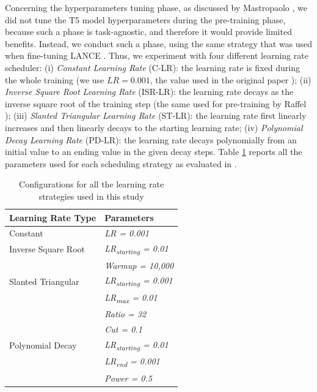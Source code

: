 Concerning the hyperparameters tuning phase, as discussed by Mastropaolo \etal \cite{mastropaolo2021studying}, we did not tune the T5 model hyperparameters during the pre-training phase, because such a phase is task-agnostic, and therefore it would provide limited benefits. Instead, we conduct such a phase, using the same strategy that was used when fine-tuning LANCE  \cite{mastropaolo2022using}. Thus, we experiment with four different learning rate scheduler: (i) \textit{Constant Learning Rate} (C-LR): the learning rate is fixed during the whole training (we use $LR = 0.001$, \ie the value used in the original paper \cite{raffel2019exploring}); (ii) \textit{Inverse Square Root Learning Rate} (ISR-LR): the learning rate decays as the inverse square root of the training step (the same used for pre-training by Raffel \etal); (iii) \textit{Slanted Triangular Learning Rate \cite{howard2018universal}} (ST-LR): the learning rate first linearly increases and then linearly decays to the starting learning rate;  (iv) \textit{Polynomial Decay Learning Rate} (PD-LR): the learning rate decays polynomially from an initial value to an ending value in the given decay steps.
Table \ref{tab:learning-rates} reports all the parameters used for each scheduling strategy as evaluated in \cite{mastropaolo2022using}.

\begin{table}[h]
	\centering
	\begin{tabular}{ll}
		\hline
		\textbf{Learning Rate Type} & \textbf{Parameters}               \\ \hline
		Constant                     & \textit{LR = 0.001}               \\
		Inverse Square Root         & \textit{LR\textsubscript{starting} = 0.01}  \\
		& \textit{Warmup = 10,000}          \\
		Slanted Triangular          & \textit{LR\textsubscript{starting} = 0.001} \\
		& \textit{LR\textsubscript{max} = 0.01}       \\
		& \textit{Ratio = 32}               \\
		& \textit{Cut = 0.1}                \\
		Polynomial Decay            & \textit{LR\textsubscript{starting} = 0.01}  \\
		& \textit{LR\textsubscript{end} = 0.001}      \\
		& \textit{Power = 0.5}              \\ \hline
	\end{tabular}
	\vspace{0.2cm}
	\caption{Configurations for all the learning rate strategies used in this study}
	\label{tab:learning-rates}
\end{table}


